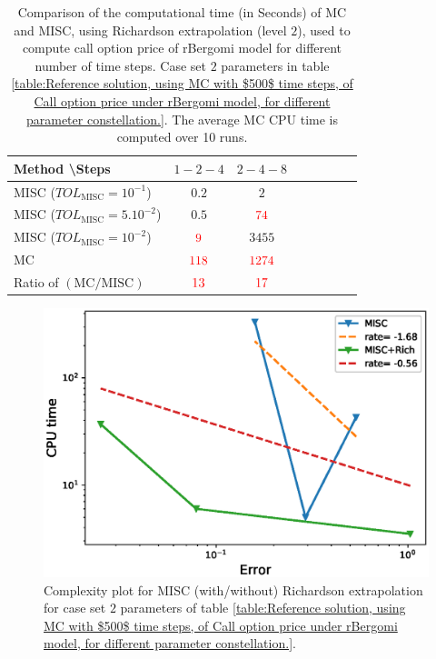 \begin{table}[!h]
	\centering
	\begin{tabular}{l*{6}{c}r}
		Method \textbackslash  Steps            & $1-2-4$ & $2-4-8$   \\
		\hline
		MISC ($TOL_{\text{MISC}}=10^{-1}$)  & $0.2$ & $2$ &   \\
		MISC ($TOL_{\text{MISC}}=5.10^{-2}$)  & $0.5$ & ${\color{red}74}$  \\
		MISC ($TOL_{\text{MISC}}=10^{-2}$)  & ${\color{red}9}$ & $3455$   \\
		\hline
		MC    & $ {\color{red}  118}$  & ${\color{red}1274}$  \\
		
		\hline
		Ratio of $\left(\text{MC}/ \text{MISC} \right)$  &${\color{red}13}$ & ${\color{red}  17}$   \\
		\hline
	\end{tabular}
	\caption{Comparison of the computational time (in Seconds) of  MC and MISC, using Richardson extrapolation (level $2$), used to compute call option price of rBergomi model for different number of time steps. Case set $2$ parameters in table \ref{table:Reference solution, using MC with $500$ time steps, of Call option price under rBergomi model, for different parameter constellation.}. The
		average MC CPU time is computed over 10 runs.}
	\label{Comparsion of the computational time of  MC and MISC, using Richardson extrapolation (level $2$), used to compute Call option price of rBergomi model for different number of time steps. Case set $2$ parameters,linear}
\end{table}


\begin{figure}[h!]
	\centering
	\includegraphics[width=0.4\linewidth]{./figures/rBergomi_Complexity_rates/set2/error_vs_time_set2_comparison_linear}
	
	\caption{Complexity plot for  MISC (with/without) Richardson extrapolation for case set $2$ parameters of table \ref{table:Reference solution, using MC with $500$ time steps, of Call option price under rBergomi model, for different parameter constellation.}.}
	\label{fig:Complexity plot for  MISC for Case set $2$ parameters, comparison}
\end{figure}




